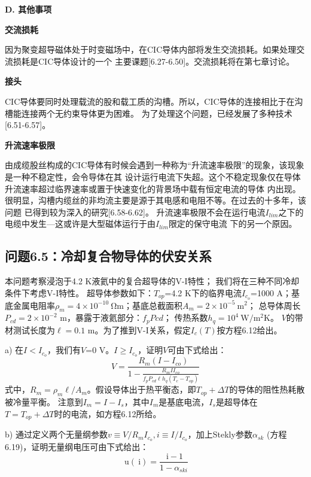 \textbf{D. 其他事项}

\textbf{交流损耗}

因为聚变超导磁体处于时变磁场中，在CIC导体内部将发生交流损耗。如果处理交流损耗是CIC导体设计的一个
主要课题[6.27-6.50]。交流损耗将在第七章讨论。

\textbf{接头}

CIC导体要同时处理载流的股和载工质的沟槽。所以，CIC导体的连接相比于在沟槽能连接两个无约束导体更为困难。
为了处理这个问题，已经发展了多种技术[6.51-6.57]。

\textbf{升流速率极限}

由成缆股丝构成的CIC导体有时候会遇到一种称为“升流速率极限”的现象，该现象是一种不稳定性，会令导体在其
设计运行电流下失超。这个不稳定现象仅在导体升流速率超过临界速率或置于快速变化的背景场中载有恒定电流的导体
内出现。很明显，沟槽内缆丝的非均流主要是源于其电感和电阻不等。在过去的十多年，该问题
已得到较为深入的研究[6.58-6.62]。
升流速率极限不会在运行电流$I_{lim}$之下的电缆中发生---这或许是大型磁体运行于由$I_{lim}$限定的保守电流
下的另一个原因。

\subsection{问题6.5：冷却复合物导体的伏安关系}
本问题考察浸泡于4.2 K液氦中的复合超导体的V-I特性；
我们将在三种不同冷却条件下考虑V-I特性。
超导体参数如下：$T_{op}$=4.2 K下的临界电流$I_{c_o}$=1000 A；基底金属电阻率$\rho_m=4\times 10^{-10}\ \mathrm{\Omega m}$；基底总截面积$A_m=2\times 10^{-5}\ \mathrm{m^2}$；
总导体周长$P_{cd}=2\times 10^{-2}$ m，暴露于液氦部分：$f_p P{cd}$；
传热系数$h_q=10^4\ \mathrm{W/m^2K}$。
$V$的带材测试长度为$\ell=0.1$ m。为了推到V-I关系，假定$I_c(T)$按方程6.12给出。

a) 在$I<I_{c_o}$，我们有$V$=0 V。$I\ge I_{c_o}$，证明$V$可由下式给出：
\begin{equation}%
V=\frac{R_m(I-I_{co})}{1-\frac{R_mII_{co}}{f_pP_{cd}\ell h_q(T_c-T_{op})}}
\end{equation}
式中，$R_m=\rho_m \ell/A_m$。假设导体出于热平衡态，即$T_{op}+\Delta T$的导体的阻性热耗散被冷量平衡。
注意到$I_m=I-I_s$，其中$I_m$是基底电流，$I_s$是超导体在$T=T_{op}+\Delta T$时的电流，如方程6.12所给。

b) 通过定义两个无量纲参数$v\equiv V/R_m I_{c_o}, i\equiv I/I_{c_o}$，加上Stekly参数$\alpha_{sk}$
(方程6.19)，证明无量纲电压可由下式给出：
\begin{equation}%
\ \mathrm{u}(\ \mathrm{i})=\frac{\ \mathrm{i}-1}{1-\alpha_{ski}}
\end{equation}

